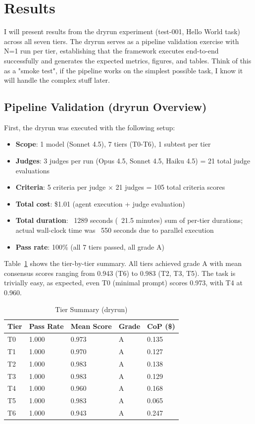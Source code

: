 \documentclass[11pt]{article}
\begin{document}
\section{Results}\label{sec:results}

I will present results from the dryrun experiment (test-001, Hello World task)
across all seven tiers. The dryrun serves as a pipeline validation exercise with
N=1 run per tier, establishing that the framework executes end-to-end
successfully and generates the expected metrics, figures, and tables. Think of
this as a "smoke test", if the pipeline works on the simplest possible task, I
know it will handle the complex stuff later.

\subsection{Pipeline Validation (dryrun Overview)}

First, the dryrun was executed with the following setup:

\begin{itemize}
\item \textbf{Scope}: 1 model (Sonnet 4.5), 7 tiers (T0-T6), 1 subtest per tier
\item \textbf{Judges}: 3 judges per run (Opus 4.5, Sonnet 4.5, Haiku 4.5) = 21 total judge evaluations
\item \textbf{Criteria}: 5 criteria per judge $\times$ 21 judges = 105 total criteria scores
\item \textbf{Total cost}: \$1.01 (agent execution + judge evaluation)
\item \textbf{Total duration}: ~1289 seconds (~21.5 minutes) sum of per-tier durations; actual wall-clock time was ~550 seconds due to parallel execution
\item \textbf{Pass rate}: 100\% (all 7 tiers passed, all grade A)
\end{itemize}

Table~\ref{tab:tier-summary} shows the tier-by-tier summary. All tiers achieved grade A with mean
consensus scores ranging from 0.943 (T6) to 0.983 (T2, T3, T5). The task is
trivially easy, as expected, even T0 (minimal prompt) scores 0.973, with T4 at 0.960.

\begin{table}[htbp]
\centering
\caption{Tier Summary (dryrun)}\label{tab:tier-summary}
\begin{tabular}{lllll}
\toprule
Tier & Pass Rate & Mean Score & Grade & CoP (\$) \\
\midrule
T0 & 1.000 & 0.973 & A & 0.135 \\
T1 & 1.000 & 0.970 & A & 0.127 \\
T2 & 1.000 & 0.983 & A & 0.138 \\
T3 & 1.000 & 0.983 & A & 0.129 \\
T4 & 1.000 & 0.960 & A & 0.168 \\
T5 & 1.000 & 0.983 & A & 0.065 \\
T6 & 1.000 & 0.943 & A & 0.247 \\
\bottomrule
\end{tabular}
\end{table}
\end{document}
